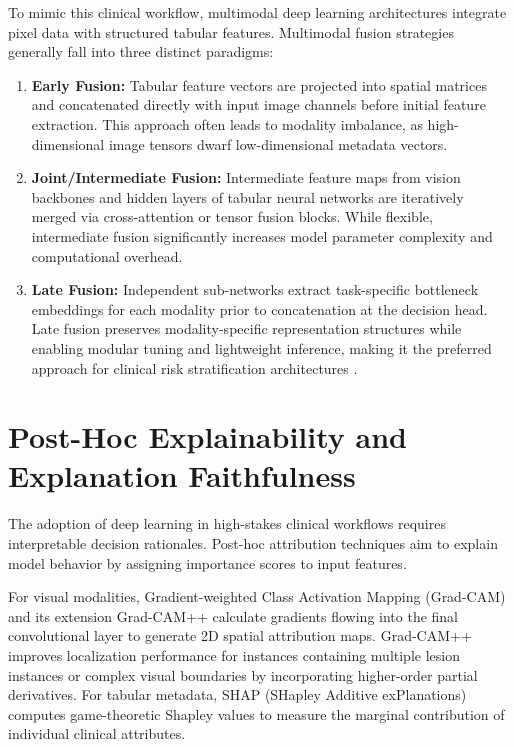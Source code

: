 \documentclass[12pt,a4paper]{report}
\begin{document}
	To mimic this clinical workflow, multimodal deep learning architectures integrate pixel data with structured tabular features. Multimodal fusion strategies generally fall into three distinct paradigms:
	\begin{enumerate}
		\item \textbf{Early Fusion:} Tabular feature vectors are projected into spatial matrices and concatenated directly with input image channels before initial feature extraction. This approach often leads to modality imbalance, as high-dimensional image tensors dwarf low-dimensional metadata vectors.
		\item \textbf{Joint/Intermediate Fusion:} Intermediate feature maps from vision backbones and hidden layers of tabular neural networks are iteratively merged via cross-attention or tensor fusion blocks. While flexible, intermediate fusion significantly increases model parameter complexity and computational overhead.
		\item \textbf{Late Fusion:} Independent sub-networks extract task-specific bottleneck embeddings for each modality prior to concatenation at the decision head. Late fusion preserves modality-specific representation structures while enabling modular tuning and lightweight inference, making it the preferred approach for clinical risk stratification architectures \cite{huang2020multimodal}.
	\end{enumerate}
	
	\section{Post-Hoc Explainability and Explanation Faithfulness}
	The adoption of deep learning in high-stakes clinical workflows requires interpretable decision rationales. Post-hoc attribution techniques aim to explain model behavior by assigning importance scores to input features.
	
	For visual modalities, Gradient-weighted Class Activation Mapping (Grad-CAM) \cite{selvaraju2017grad} and its extension Grad-CAM++ \cite{chattopadhay2018grad} calculate gradients flowing into the final convolutional layer to generate 2D spatial attribution maps. Grad-CAM++ improves localization performance for instances containing multiple lesion instances or complex visual boundaries by incorporating higher-order partial derivatives. For tabular metadata, SHAP (SHapley Additive exPlanations) \cite{lundberg2017unified} computes game-theoretic Shapley values to measure the marginal contribution of individual clinical attributes.
	
\end{document}
